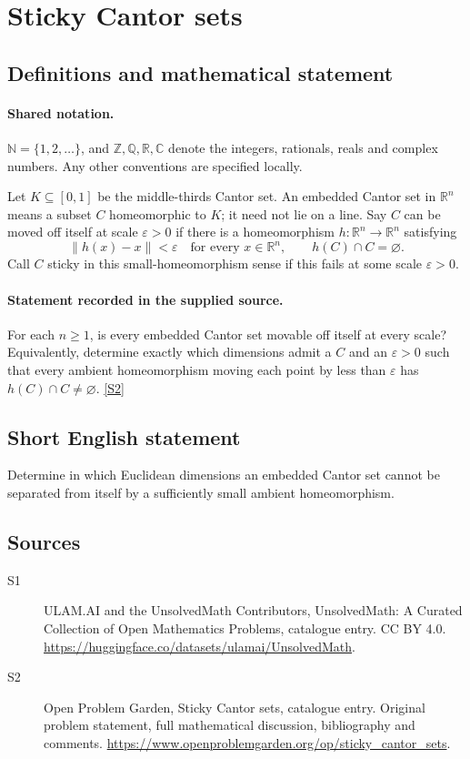 \documentclass[11pt]{article}
\newcommand{\sref}[2]{\hyperlink{source:#1:#2}{[S#2]}}
\begin{document}
\section{Sticky Cantor sets}\label{statement}

\subsection{Definitions and mathematical statement}

\paragraph{Shared notation.}$\mathbb N=\{1,2,\ldots\}$, and $\mathbb Z,\mathbb Q,\mathbb R,\mathbb C$ denote the integers, rationals, reals and complex numbers. Any other conventions are specified locally.


Let $K\subseteq[0,1]$ be the middle-thirds Cantor set. An embedded Cantor set in $\mathbb R^n$ means a subset $C$ homeomorphic to $K$; it need not lie on a line. Say $C$ can be moved off itself at scale $\varepsilon>0$ if there is a homeomorphism $h:\mathbb R^n\to\mathbb R^n$ satisfying
\[
 \|h(x)-x\|<\varepsilon\quad\text{for every }x\in\mathbb R^n,
 \qquad h(C)\cap C=\varnothing.
\]
Call $C$ sticky in this small-homeomorphism sense if this fails at some scale $\varepsilon>0$.
\paragraph{Statement recorded in the supplied source.}
For each $n\ge1$, is every embedded Cantor set movable off itself at every scale? Equivalently, determine exactly which dimensions admit a $C$ and an $\varepsilon>0$ such that every ambient homeomorphism moving each point by less than $\varepsilon$ has $h(C)\cap C\ne\varnothing$. \sref{statement}{2}
\subsection{Short English statement}
Determine in which Euclidean dimensions an embedded Cantor set cannot be separated from itself by a sufficiently small ambient homeomorphism.
\subsection{Sources}
\begin{description}
\item[\hypertarget{source:statement:1}{S1}] ULAM.AI and the UnsolvedMath Contributors, UnsolvedMath: A Curated Collection of Open Mathematics Problems, catalogue entry. CC BY 4.0. \url{https://huggingface.co/datasets/ulamai/UnsolvedMath}.
\item[\hypertarget{source:statement:2}{S2}] Open Problem Garden, Sticky Cantor sets, catalogue entry. Original problem statement, full mathematical discussion, bibliography and comments. \url{https://www.openproblemgarden.org/op/sticky_cantor_sets}.
\end{description}
\label{end:statement}
\end{document}

